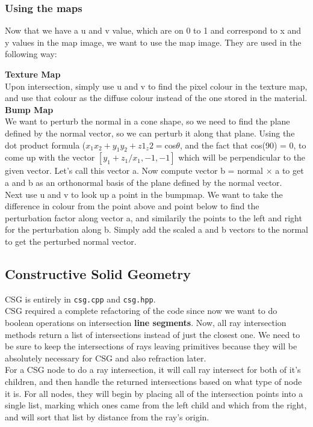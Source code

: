 \documentclass {article}
\begin{document}
\subsubsection{Using the maps}
Now that we have a u and v value, which are on 0 to 1 and correspond to x and y
values in the map image, we want to use the map image.  They are used in the
following way:

\textbf{Texture Map}\\
Upon intersection, simply use u and v to find the pixel colour in the texture
map, and use that colour as the diffuse colour instead of the one stored in the
material.\\

\textbf{Bump Map}\\
We want to perturb the normal in a cone shape, so we need to find the plane
defined by the normal vector, so we can perturb it along that plane.
Using the dot product formula ($x_1x_2 + y_1y_2 + z1_z2 = $cos$\theta$, and the
fact that cos(90) = 0, to come up with the vector $[y_1 + z_1 / x_1, -1, -1]$
which will be perpendicular to the given vector.  Let's call this vector a.  Now
compute vector b = normal $\times$ a to get a and b as an orthonormal basis of
the plane defined by the normal vector.\\
Next use u and v to look up a point in the bumpmap.  We want to take the
difference in colour from the point above and point below to find the
perturbation factor along vector a, and similarily the points to the left and
right for the perturbation along b.  Simply add the scaled a and b vectors to
the normal to get the perturbed normal vector.

\subsection{Constructive Solid Geometry}
CSG is entirely in \verb!csg.cpp! and \verb!csg.hpp!.\\

CSG required a complete refactoring of the code since now we want to do boolean
operations on intersection \textbf{line segments}.  Now, all ray intersection
methods return a list of intersections instead of just the closest one.  We need
to be sure to keep the intersections of rays leaving primitives because they
will be absolutely necessary for CSG and also refraction later.\\

For a CSG node to do a ray intersection, it will call ray intersect for both of
it's children, and then handle the returned intersections based on what type of
node it is.  For all nodes, they will begin by placing all of the intersection
points into a single list, marking which ones came from the left child and which
from the right, and will sort that list by distance from the ray's origin.\\
\end{document}
